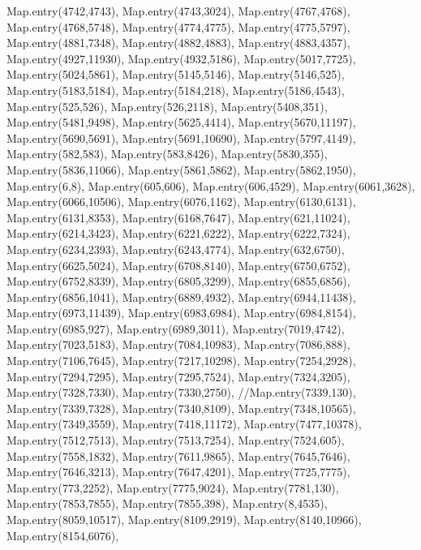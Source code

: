     Map.entry(4742,4743),
    Map.entry(4743,3024),
    Map.entry(4767,4768),
    Map.entry(4768,5748),
    Map.entry(4774,4775),
    Map.entry(4775,5797),
    Map.entry(4881,7348),
    Map.entry(4882,4883),
    Map.entry(4883,4357),
    Map.entry(4927,11930),
    Map.entry(4932,5186),
    Map.entry(5017,7725),
    Map.entry(5024,5861),
    Map.entry(5145,5146),
    Map.entry(5146,525),
    Map.entry(5183,5184),
    Map.entry(5184,218),
    Map.entry(5186,4543),
    Map.entry(525,526),
    Map.entry(526,2118),
    Map.entry(5408,351),
    Map.entry(5481,9498),
    Map.entry(5625,4414),
    Map.entry(5670,11197),
    Map.entry(5690,5691),
    Map.entry(5691,10690),
    Map.entry(5797,4149),
    Map.entry(582,583),
    Map.entry(583,8426),
    Map.entry(5830,355),
    Map.entry(5836,11066),
    Map.entry(5861,5862),
    Map.entry(5862,1950),
    Map.entry(6,8),
    Map.entry(605,606),
    Map.entry(606,4529),
    Map.entry(6061,3628),
    Map.entry(6066,10506),
    Map.entry(6076,1162),
    Map.entry(6130,6131),
    Map.entry(6131,8353),
    Map.entry(6168,7647),
    Map.entry(621,11024),
    Map.entry(6214,3423),
    Map.entry(6221,6222),
    Map.entry(6222,7324),
    Map.entry(6234,2393),
    Map.entry(6243,4774),
    Map.entry(632,6750),
    Map.entry(6625,5024),
    Map.entry(6708,8140),
    Map.entry(6750,6752),
    Map.entry(6752,8339),
    Map.entry(6805,3299),
    Map.entry(6855,6856),
    Map.entry(6856,1041),
    Map.entry(6889,4932),
    Map.entry(6944,11438),
    Map.entry(6973,11439),
    Map.entry(6983,6984),
    Map.entry(6984,8154),
    Map.entry(6985,927),
    Map.entry(6989,3011),
    Map.entry(7019,4742),
    Map.entry(7023,5183),
    Map.entry(7084,10983),
    Map.entry(7086,888),
    Map.entry(7106,7645),
    Map.entry(7217,10298),
    Map.entry(7254,2928),
    Map.entry(7294,7295),
    Map.entry(7295,7524),
    Map.entry(7324,3205),
    Map.entry(7328,7330),
    Map.entry(7330,2750),
    //Map.entry(7339,130),
    Map.entry(7339,7328),
    Map.entry(7340,8109),
    Map.entry(7348,10565),
    Map.entry(7349,3559),
    Map.entry(7418,11172),
    Map.entry(7477,10378),
    Map.entry(7512,7513),
    Map.entry(7513,7254),
    Map.entry(7524,605),
    Map.entry(7558,1832),
    Map.entry(7611,9865),
    Map.entry(7645,7646),
    Map.entry(7646,3213),
    Map.entry(7647,4201),
    Map.entry(7725,7775),
    Map.entry(773,2252),
    Map.entry(7775,9024),
    Map.entry(7781,130),
    Map.entry(7853,7855),
    Map.entry(7855,398),
    Map.entry(8,4535),
    Map.entry(8059,10517),
    Map.entry(8109,2919),
    Map.entry(8140,10966),
    Map.entry(8154,6076),
